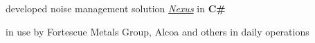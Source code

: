 \documentclass[a4paper]{style}
\begin{document}
\begin{minipage}[t]{0.54\textwidth}
\vspace{-1pt}
\begin{tightitemize}
    \item developed noise management solution \href{https://www.vanguardtech.com.au/products/nexus/}{\textit{Nexus}} in \textbf{C\#}
        \vspace{2pt}
        \begin{tightitemize}
            \item in use by Fortescue Metals Group, Alcoa and others in daily operations
        \end{tightitemize}
\end{tightitemize}

\sectionspace{}

\end{minipage} %
\hfill
%
%
\end{document}
